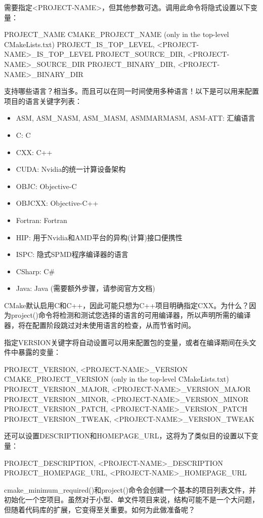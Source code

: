 需要指定<PROJECT-NAME>，但其他参数可选。调用此命令将隐式设置以下变量：

\begin{shell}
PROJECT_NAME
CMAKE_PROJECT_NAME (only in the top-level CMakeLists.txt)
PROJECT_IS_TOP_LEVEL, <PROJECT-NAME>_IS_TOP_LEVEL
PROJECT_SOURCE_DIR, <PROJECT-NAME>_SOURCE_DIR
PROJECT_BINARY_DIR, <PROJECT-NAME>_BINARY_DIR
\end{shell}

支持哪些语言？相当多。而且可以在同一时间使用多种语言！以下是可以用来配置项目的语言关键字列表：

\begin{itemize}
\item
ASM, ASM\_NASM, ASM\_MASM, ASMMARMASM, ASM-ATT: 汇编语言

\item
C: C

\item
CXX: C++

\item
CUDA: Nvidia的统一计算设备架构

\item
OBJC: Objective-C

\item
OBJCXX: Objective-C++

\item
Fortran: Fortran

\item
HIP: 用于Nvidia和AMD平台的异构(计算)接口便携性

\item
ISPC: 隐式SPMD程序编译器的语言

\item
CSharp: C\#

\item
Java: Java (需要额外步骤，请参阅官方文档)
\end{itemize}

CMake默认启用C和C++，因此可能只想为C++项目明确指定CXX。为什么？因为project()命令将检测和测试您选择的语言的可用编译器，所以声明所需的编译器，将在配置阶段跳过对未使用语言的检查，从而节省时间。

指定VERSION关键字将自动设置可以用来配置包的变量，或者在编译期间在头文件中暴露的变量：

\begin{shell}
PROJECT_VERSION, <PROJECT-NAME>_VERSION
CMAKE_PROJECT_VERSION (only in the top-level CMakeLists.txt)
PROJECT_VERSION_MAJOR, <PROJECT-NAME>_VERSION_MAJOR
PROJECT_VERSION_MINOR, <PROJECT-NAME>_VERSION_MINOR
PROJECT_VERSION_PATCH, <PROJECT-NAME>_VERSION_PATCH
PROJECT_VERSION_TWEAK, <PROJECT-NAME>_VERSION_TWEAK
\end{shell}

还可以设置DESCRIPTION和HOMEPAGE\_URL，这将为了类似目的设置以下变量：

\begin{shell}
PROJECT_DESCRIPTION, <PROJECT-NAME>_DESCRIPTION
PROJECT_HOMEPAGE_URL, <PROJECT-NAME>_HOMEPAGE_URL
\end{shell}

cmake\_minimum\_required()和project()命令会创建一个基本的项目列表文件，并初始化一个空项目。虽然对于小型、单文件项目来说，结构可能不是一个大问题，但随着代码库的扩展，它变得至关重要。如何为此做准备呢？


